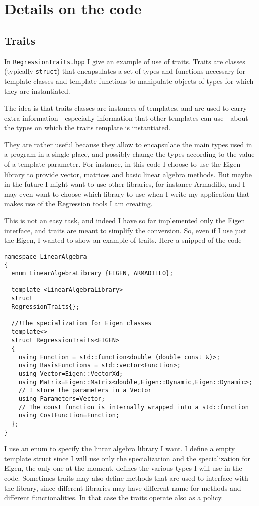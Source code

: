 \documentclass{article}
\newcommand{\li}{\lstinline}
\begin{document}
\section{Details on the code}
\subsection{Traits}
In \texttt{RegressionTraits.hpp} I give an example of use of traits.
Traits are classes (typically \li!struct!) that encapsulates a set of types and functions necessary for template classes and template functions to manipulate objects of types for which they are instantiated.

The idea is that traits classes are instances of templates, and are used to carry extra information—especially information that other templates can use—about the types on which the traits template is instantiated.

They are rather useful because they allow to encapsulate the main
types used in a program in a single place, and possibly change the
types according to the value of a template parameter. For instance, in
this code I choose to use the Eigen library to provide vector,
matrices and basic linear algebra methods. But maybe in the future I
might want to use other libraries, for instance Armadillo, and I may
even want to choose which library to use when I write my application
that makes use of the Regression tools I am creating.

This is not an easy task, and indeed I have so far implemented only the Eigen interface, and traits are meant to simplify the conversion. So, even if I use just the Eigen, I wanted to show an example of traits. Here a snipped of the code
\begin{lstlisting}[title={RegressionTraits.hpp}]
namespace LinearAlgebra
{
  enum LinearAlgebraLibrary {EIGEN, ARMADILLO};

  template <LinearAlgebraLibrary>
  struct
  RegressionTraits{};

  //!The specialization for Eigen classes
  template<>
  struct RegressionTraits<EIGEN>
  {
    using Function = std::function<double (double const &)>;
    using BasisFunctions = std::vector<Function>; 
    using Vector=Eigen::VectorXd;
    using Matrix=Eigen::Matrix<double,Eigen::Dynamic,Eigen::Dynamic>;
    // I store the parameters in a Vector
    using Parameters=Vector;
    // The const function is internally wrapped into a std::function
    using CostFunction=Function;
  };
}
\end{lstlisting}
I use an enum to specify the linrar algebra library I want. I define a empty template struct since I will use only the specialization and the
specialization for Eigen, the only one at the moment,
defines the various types I will use in the code.  Sometimes traits
may also define methods that are used to interface with the library,
since different libraries may have different name for methods and different
functionalities. In that case the traits operate also as a policy.
\end{document}
